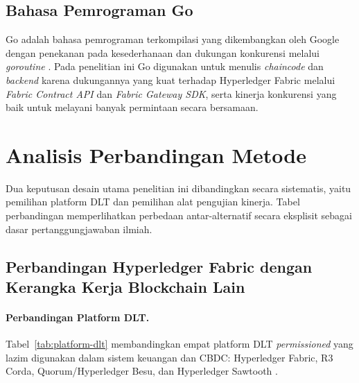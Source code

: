 \subsection{Bahasa Pemrograman Go}

Go adalah bahasa pemrograman terkompilasi yang dikembangkan oleh Google dengan
penekanan pada kesederhanaan dan dukungan konkurensi melalui \textit{goroutine} \cite{donovan2015go}.
Pada penelitian ini Go digunakan untuk menulis \textit{chaincode} dan
\textit{backend} karena dukungannya yang kuat terhadap Hyperledger Fabric
melalui \textit{Fabric Contract API} dan \textit{Fabric Gateway SDK}, serta
kinerja konkurensi yang baik untuk melayani banyak permintaan secara
bersamaan.

\section{Analisis Perbandingan Metode}

Dua keputusan desain utama penelitian ini dibandingkan secara sistematis, yaitu
pemilihan platform DLT dan pemilihan alat pengujian kinerja. Tabel perbandingan
memperlihatkan perbedaan antar-alternatif secara eksplisit sebagai dasar
pertanggungjawaban ilmiah.

\subsection{Perbandingan Hyperledger Fabric dengan Kerangka Kerja Blockchain Lain}
\paragraph{Perbandingan Platform DLT.}
Tabel~\ref{tab:platform-dlt} membandingkan empat platform DLT
\textit{permissioned} yang lazim digunakan dalam sistem keuangan dan CBDC:
Hyperledger Fabric, R3 Corda, Quorum/Hyperledger Besu, dan Hyperledger
Sawtooth \cite{compendium_blockchain, androulaki2018, sethaput2025}.

